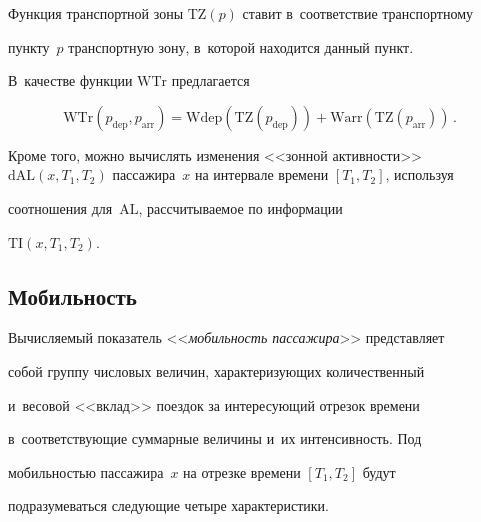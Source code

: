 Функция транспортной зоны $\mathrm{TZ}(p)$ ставит в~соответствие транспортному 


пункту~$p$ транспортную зону, в~которой находится данный пункт. 


В~качестве функции $\mathrm{WTr}$ предлагается


$$


\mathrm{WTr}\left(p_{\mathrm{dep}}, p_{\mathrm{arr}}\right) =


\mathrm{Wdep}\left(\mathrm{TZ}(p_{\mathrm{dep}})\right) +


\mathrm{Warr}\left(\mathrm{TZ}(p_{\mathrm{arr}})\right)\,.


$$





Кроме того, можно вычислять изменения <<зонной активности>> $\mathrm{dAL}(x, 


T_1, T_2)$ пассажира~$x$ на интервале времени $[T_1, T_2]$, используя 


соотношения для~$\mathrm{AL}$, рас\-счи\-ты\-ва\-емое по информации  


$\mathrm{TI}(x, T_1, T_2)$.





\subsection{Мобильность} %





Вычисляемый показатель <<\textit{мобильность пассажира}>> представляет 


собой группу чис\-ло\-вых величин, ха\-рак\-те\-ри\-зу\-ющих количественный 


и~весовой <<вклад>> поездок за ин\-те\-ре\-су\-ющий отрезок времени 


в~соответствующие суммарные величины и~их ин\-тен\-сив\-ность. Под 


мо\-биль\-ностью пассажира~$x$ на отрезке времени $[T_1, T_2]$ будут 


подразумеваться сле\-ду\-ющие четыре характеристики.


